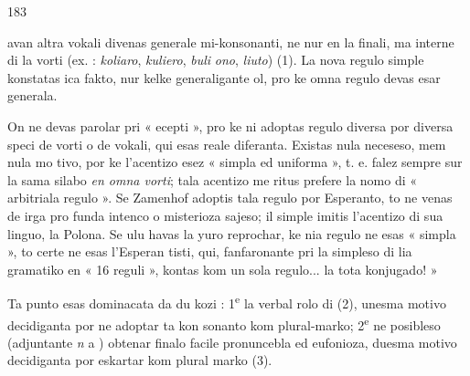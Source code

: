 \begin{VUpage}[187]{183}

\VUcontinue
avan altra vokali divenas generale mi-konsonanti, ne nur en\nl
la finali, ma interne di la vorti (ex. : \textit{koliaro}, \textit{kuliero}, \textit{buli}\cc
\textit{ono}, \textit{liuto}) (1). La nova regulo simple konstatas ica fakto,\nl
nur kelke generaligante ol, pro ke omna regulo devas esar\nl
generala.

On ne devas parolar pri « ecepti », pro ke ni adoptas\nl
regulo diversa por diversa speci de vorti o de vokali, qui\nl
esas reale diferanta. Existas nula neceseso, mem nula mo\cc
tivo, por ke l'acentizo esez « simpla ed uniforma », t. e. falez\nl
sempre sur la sama silabo \textit{en omna vorti}; tala acentizo me\cc
ritus prefere la nomo di « arbitriala regulo ». Se Zamenhof\nl
adoptis tala regulo por Esperanto, to ne venas de irga pro\cc
funda intenco o misterioza sajeso; il simple imitis l'acentizo\nl
di sua linguo, la Polona. Se ulu havas la yuro reprochar,\nl
ke nia regulo ne esas « simpla », to certe ne esas l'Esperan\cc
tisti, qui, fanfaronante pri la simpleso di lia gramatiko en\nl
« 16 reguli », kontas kom un sola regulo... la tota konjugado! »\parplein

\VUsaut{4.61mm}
\VUfilet{7.9mm}
\VUsaut{3.20mm}
\VUsaut{0.87mm}
\VUsaut{3.60mm}

Ta punto esas dominacata da du kozi : 1\textsuperscript{e} la verbal rolo\nl
di  (2), unesma motivo decidiganta por ne adoptar ta kon\cc
sonanto kom plural-marko; 2\textsuperscript{e} ne posibleso (adjuntante\nl
\textit{n} a ) obtenar finalo facile pronuncebla ed eufonioza,\nl
duesma motivo decidiganta por eskartar  kom plural\cc
marko (3).
\end{VUpage}

